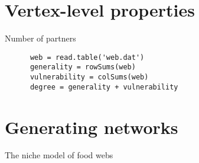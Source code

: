 \documentclass[professionalfonts,12pt]{beamer}
\begin{document}
\section{Vertex-level properties}


\begin{frame}[fragile]{Number of partners}
   \begin{verbatim}
      web = read.table('web.dat')
      generality = rowSums(web)
      vulnerability = colSums(web)
      degree = generality + vulnerability
   \end{verbatim}
\end{frame}

\section{Generating networks}

\begin{frame}{The niche model of food webs}

\end{frame}
\end{document}
